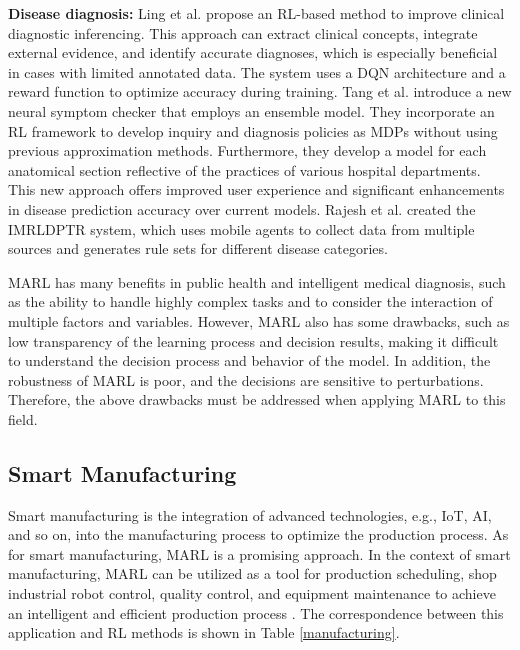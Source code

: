 \documentclass[acmsmall]{acmart}
\begin{document}
\textbf{Disease diagnosis: }
Ling et al. \cite{pmlr-v68-ling17a, ling-etal-2017-learning} propose an RL-based method to improve clinical diagnostic inferencing. This approach can extract clinical concepts, integrate external evidence, and identify accurate diagnoses, which is especially beneficial in cases with limited annotated data. The system uses a DQN architecture and a reward function to optimize accuracy during training.
Tang et al. \cite{tang2016inquire} introduce a new neural symptom checker that employs an ensemble model. They incorporate an RL framework to develop inquiry and diagnosis policies as MDPs without using previous approximation methods. Furthermore, they develop a model for each anatomical section reflective of the practices of various hospital departments. This new approach offers improved user experience and significant enhancements in disease prediction accuracy over current models.
Rajesh et al. \cite{10010747} created the IMRLDPTR system, which uses mobile agents to collect data from multiple sources and generates rule sets for different disease categories.

MARL has many benefits in public health and intelligent medical diagnosis, such as the ability to handle highly complex tasks and to consider the interaction of multiple factors and variables. However, MARL also has some drawbacks, such as low transparency of the learning process and decision results, making it difficult to understand the decision process and behavior of the model. In addition, the robustness of MARL is poor, and the decisions are sensitive to perturbations. Therefore, the above drawbacks must be addressed when applying MARL to this field.

\subsection{Smart Manufacturing}
Smart manufacturing is the integration of advanced technologies, e.g., IoT, AI, and so on, into the manufacturing process to optimize the production process. As for smart manufacturing, MARL is a promising approach. In the context of smart manufacturing, MARL can be utilized as a tool for production scheduling, shop industrial robot control, quality control, and equipment maintenance to achieve an intelligent and efficient production process \cite{LI202375}. The correspondence between this application and RL methods is shown in Table \ref{manufacturing}.
\end{document}
